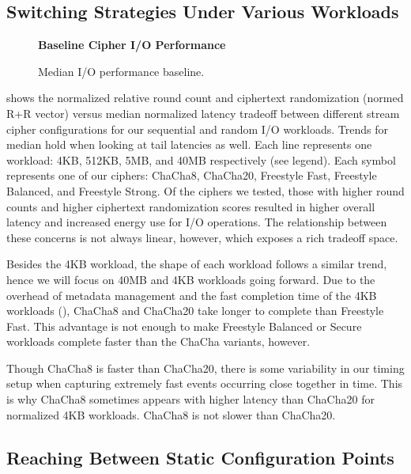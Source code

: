 \subsection{Switching Strategies Under Various Workloads} \label{subsec:1}

\begin{figure}[ht]
  \textbf{Baseline Cipher I/O Performance}\par\medskip
  {} \caption{Median I/O performance
  baseline.}
 \label{fig:tradeoff-no-ratios}
\end{figure}

 shows the normalized relative round count and
ciphertext randomization (normed R+R vector) versus median normalized latency
tradeoff between different stream cipher configurations for our sequential and
random I/O workloads. Trends for median hold when looking at tail latencies as
well. Each line represents one workload: 4KB, 512KB, 5MB, and 40MB respectively
(see legend). Each symbol represents one of our ciphers: ChaCha8, ChaCha20,
Freestyle Fast, Freestyle Balanced, and Freestyle Strong. Of the ciphers we
tested, those with higher round counts and higher ciphertext randomization
scores resulted in higher overall latency and increased energy use for I/O
operations. The relationship between these concerns is not always linear,
however, which exposes a rich tradeoff space.

Besides the 4KB workload, the shape of each workload follows a similar trend,
hence we will focus on 40MB and 4KB workloads going forward. Due to the overhead
of metadata management and the fast completion time of the 4KB workloads
(), ChaCha8 and ChaCha20 take
longer to complete than Freestyle Fast. This advantage is not enough to make
Freestyle Balanced or Secure workloads complete faster than the ChaCha variants,
however.

Though ChaCha8 is faster than ChaCha20, there is some variability in
our timing setup when capturing extremely fast events occurring close together
in time. This is why ChaCha8 sometimes appears with higher latency than ChaCha20
for normalized 4KB workloads. ChaCha8 is not slower than ChaCha20.

\subsection{Reaching Between Static Configuration Points} \label{subsec:2}

